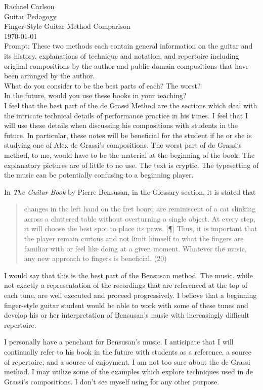\documentclass[12pt]{article}
\begin{document}
\noindent Rachael Carlson\\
\noindent Guitar Pedagogy\\
\noindent Finger-Style Guitar Method Comparison\\
\noindent \today\\

\noindent Prompt: These two methods each contain general information on the guitar and its history, explanations of technique and notation, and repertoire including original compositions by the author and public domain compositions that have been arranged by the author.\\

\noindent What do you consider to be the best parts of each? The worst?\\
\noindent In the future, would you use these books in your teaching?\\

\noindent I feel that the best part of the de Grassi Method are the sections which deal with the intricate technical details of performance practice in his tunes. I feel that I will use these details when discussing his compositions with students in the future. In particular, these notes will be beneficial for the student if he or she is studying one of Alex de Grassi's compositions. The worst part of de Grassi's method, to me, would have to be the material at the beginning of the book. The explanatory pictures are of little to no use. The text is cryptic. The typesetting of the music can be potentially confusing to a beginning player.

In \emph{The Guitar Book} by Pierre Bensusan, in the Glossary section, it is stated that
\begin{quote}
changes in the left hand on the fret board are reminiscent of a cat slinking across a cluttered table without overturning a single object. At every step, it will choose the best spot to place its paws. [¶] Thus, it is important that the player remain curious and not limit himself to what the fingers are familiar with or feel like doing at a given moment. Whatever the music, any new approach to fingers is beneficial. (20)
\end{quote}
I would say that this is the best part of the Bensusan method. The music, while not exactly a representation of the recordings that are referenced at the top of each tune, are well executed and proceed progressively. I believe that a beginning finger-style guitar student would be able to work with some of these tunes and develop his or her interpretation of Bensusan's music with increasingly difficult repertoire.

I personally have a penchant for Bensusan's music. I anticipate that I will continually refer to his book in the future with students as a reference, a source of repertoire, and a source of enjoyment. I am not too sure about the de Grassi method. I may utilize some of the examples which explore techniques used in de Grassi's compositions. I don't see myself using for any other purpose.
\end{document}
